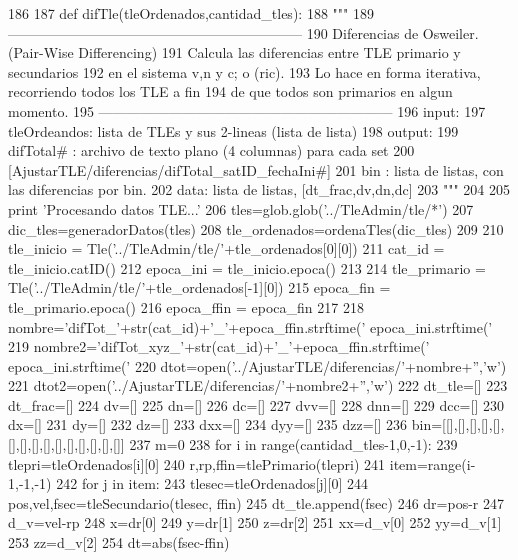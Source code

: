 \begin{DoxyCode}
186 
187 def difTle(tleOrdenados,cantidad_tles):
188     """
189     ---------------------------------------------------------------
190     Diferencias de Osweiler. (Pair-Wise Differencing)
191     Calcula las diferencias entre TLE primario y secundarios
192     en el sistema v,n y c;  o (ric). 
193     Lo hace en forma iterativa, recorriendo todos los TLE a fin
194     de que todos son primarios en algun momento.
195     ---------------------------------------------------------------
196     input:
197         tleOrdeandos: lista de TLEs y sus 2-lineas (lista de lista)
198     output:
199         difTotal# : archivo de texto plano (4 columnas) para cada set
200         [AjustarTLE/diferencias/difTotal_satID_fechaIni#]
201         bin : lista de listas, con las diferencias por bin. 
202         data: lista de listas, [dt_frac,dv,dn,dc]
203     """  
204     
205     print 'Procesando datos TLE...'
206     tles=glob.glob('../TleAdmin/tle/*')
207     dic_tles=generadorDatos(tles)
208     tle_ordenados=ordenaTles(dic_tles)
209     
210     tle_inicio = Tle('../TleAdmin/tle/'+tle_ordenados[0][0])
211     cat_id = tle_inicio.catID()
212     epoca_ini = tle_inicio.epoca()
213     
214     tle_primario = Tle('../TleAdmin/tle/'+tle_ordenados[-1][0])
215     epoca_fin  = tle_primario.epoca()
216     epoca_ffin = epoca_fin
217     
218     nombre='difTot_'+str(cat_id)+'_'+epoca_ffin.strftime('%
      epoca_ini.strftime('%
219     nombre2='difTot_xyz_'+str(cat_id)+'_'+epoca_ffin.strftime('%
      epoca_ini.strftime('%
220     dtot=open('../AjustarTLE/diferencias/'+nombre+'','w')
221     dtot2=open('../AjustarTLE/diferencias/'+nombre2+'','w')
222     dt_tle=[]
223     dt_frac=[]
224     dv=[]
225     dn=[]
226     dc=[]
227     dvv=[]
228     dnn=[]
229     dcc=[]
230     dx=[]
231     dy=[]
232     dz=[]
233     dxx=[]
234     dyy=[]
235     dzz=[]
236     bin=[[],[],[],[],[],[],[],[],[],[],[],[],[],[],[]]
237     m=0
238     for i in range(cantidad_tles-1,0,-1):       
239         tlepri=tleOrdenados[i][0]
240         r,rp,ffin=tlePrimario(tlepri)     
241         item=range(i-1,-1,-1)       
242         for j in item:
243             tlesec=tleOrdenados[j][0]
244             pos,vel,fsec=tleSecundario(tlesec, ffin)
245             dt_tle.append(fsec)
246             dr=pos-r
247             d_v=vel-rp
248             x=dr[0]
249             y=dr[1]
250             z=dr[2]
251             xx=d_v[0]
252             yy=d_v[1]
253             zz=d_v[2]
254             dt=abs(fsec-ffin)

\end{DoxyCode}
